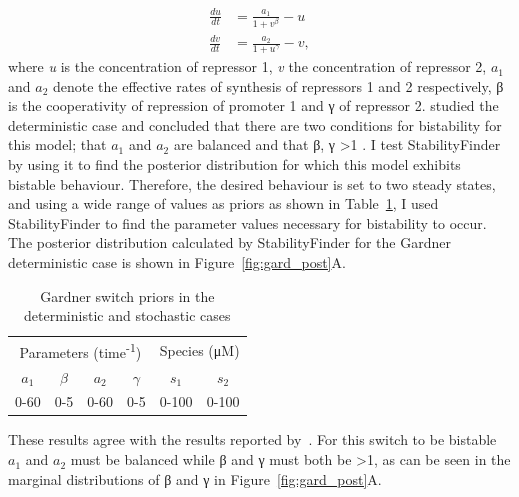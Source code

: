\begin{align}
\frac{du}{dt} &= \frac{a_1}{1+v^{\beta}} - u\\
\frac{dv}{dt} &= \frac{a_2}{1+u^{\gamma }} - v,
\end{align}
\noindent where \textit{u} is the concentration of repressor 1, \textit{v} the concentration of repressor 2, $a_1$ and $a_2$ denote the effective rates of synthesis of repressors 1 and 2 respectively, β is the cooperativity of repression of promoter 1 and γ of repressor 2. \textcite{Gardner:2000vha} studied the deterministic case and concluded that there are two conditions for bistability for this model; that $a_1$ and $a_2$ are balanced and that β, γ \textgreater 1 \autocite{Gardner:2000vha}. I test StabilityFinder by using it to find the posterior distribution for which this model exhibits bistable behaviour. Therefore, the desired behaviour is set to two steady states, and using a wide range of values as priors as shown in Table~\ref{tab:gard_det_stoch}, I used StabilityFinder to find the parameter values necessary for bistability to occur. The posterior distribution calculated by StabilityFinder for the Gardner deterministic case is shown in Figure~\ref{fig:gard_post}A.

\begin{table}[htbp]
\centering
\caption{Gardner switch priors in the deterministic and stochastic cases}
\label{tab:gard_det_stoch}
\begin{tabular}{@{}cccccc@{}}
\toprule
\multicolumn{4}{c}{Parameters (time\textsuperscript{-1})}                          & \multicolumn{2}{c}{Species (μM)} \\ \cmidrule(lr){1-4}
\cmidrule(lr){5-6}
$a_1$ & $\beta$ & $a_2$ & \multicolumn{1}{c}{$\gamma$} & $s_1$        & $s_2$        \\
0-60  & 0-5     & 0-60  & 0-5                           & 0-100        & 0-100        \\ \bottomrule
\end{tabular}
\end{table}

These results agree with the results reported by~\textcite{Gardner:2000vha}. For this switch to be bistable $a_1$ and $a_2$ must be balanced while β and γ must both be \textgreater 1, as can be seen in the marginal distributions of β and γ in Figure~\ref{fig:gard_post}A.

